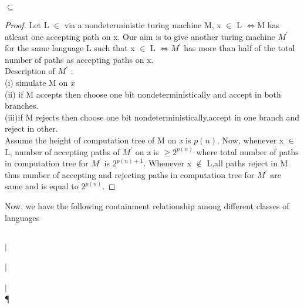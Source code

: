 \documentclass[11pt]{article}
\begin{document}
\begin{claim}
  \NP $\subseteq$ \PP
\end{claim}
\begin{proof}
Let L $\in$  \NP  via a nondeterministic turing machine M,  x $\in$ L $\iff$M has atleast one accepting path on x. 
Our aim is to give another turing machine $M^{'}$ for the same language L such that
x $\in$ L $\iff M^{'}$ has more than half of the total number of paths as accepting paths on x.\\
Description of $M^{'}$ :\\ (i)  simulate M on {\em x}\\
                        (ii) if M accepts then choose one bit nondeterministically and accept in both branches.\\
                       (iii)if M rejects then choose one bit nondeterministically,accept in one branch
                            and reject in other.\\
Assume the height of computation tree of M on {\em x} is $p(n)$. Now, whenever x $\in$ L, number of
accepting paths of $M^{'}$ on {\em x} is $\ge 2^{p(n)}$ where total number of paths in computation tree
for $M^{'}$ is $2^{p(n)+1}$. Whenever x $\not\in$ L,all paths reject in M thus  number of accepting and rejecting
paths in computation tree for $M^{'}$ are same and is equal to $2^{p(n)}$.
\end{proof}
Now, we have the following containment relationship among different classes of languages
 
\begin{center}
\PSPACE \\ 
$\vert$ \\
\PP \\
$\vert$ \\
\NP \\
$\vert$ \\
\P
\end{center}
\end{document}

